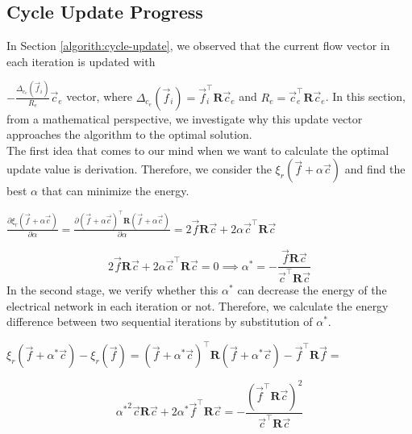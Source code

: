 \subsection{Cycle Update Progress}
\label{cycle-update-progress}
In Section \ref{algorith:cycle-update}, we observed that the current flow vector in each iteration is updated with 

$-\frac{\Delta_{c_e}(\overrightarrow{f}_i)}{R_e} \overrightarrow{c}_e$ vector, where $\Delta_{c_e}(\overrightarrow{f}_i) = \overrightarrow{f}_i^\top \mathbf{R} \overrightarrow{c}_e$ and $R_e=\overrightarrow{c}_e^\top \mathbf{R} \overrightarrow{c}_e$. In this section, from a mathematical perspective, we investigate why this update vector approaches the algorithm to the optimal solution.\\
The first idea that comes to our mind when we want to calculate the optimal update value is derivation. Therefore, we consider the $\xi_r(\overrightarrow{f}+\alpha \overrightarrow{c})$ and find the best $\alpha$ that can minimize the energy.
\begin{center}
    
    $\frac{\partial \xi_r(\overrightarrow{f}+\alpha \overrightarrow{c})}{\partial \alpha} =
    \frac{\partial (\overrightarrow{f}+\alpha \overrightarrow{c})^\top \textbf{R} (\overrightarrow{f}+\alpha \overrightarrow{c})}{\partial \alpha}= 2 \overrightarrow{f} \textbf{R} \overrightarrow{c} + 2 \alpha \overrightarrow{c}^\top \textbf{R} \overrightarrow{c}$
\end{center}
\begin{equation}
    \label{gradient-to-alpha}
    2 \overrightarrow{f} \textbf{R} \overrightarrow{c} + 2 \alpha \overrightarrow{c}^\top \textbf{R} \overrightarrow{c}=0 \implies \alpha^* = -\frac{\overrightarrow{f} \textbf{R} \overrightarrow{c}}{\overrightarrow{c}^\top \textbf{R} \overrightarrow{c}}
\end{equation}
In the second stage, we verify whether this $\alpha^*$ can decrease the energy of the electrical network in each iteration or not. Therefore, we calculate the energy difference between two sequential iterations by substitution of $\alpha^*$. 
\begin{center}
    $\xi_r(\overrightarrow{f}+\alpha^* \overrightarrow{c}) - \xi_r(\overrightarrow{f})=(\overrightarrow{f}+\alpha^* \overrightarrow{c})^\top \textbf{R} (\overrightarrow{f}+\alpha^* \overrightarrow{c}) - \overrightarrow{f}^\top \textbf{R} \overrightarrow{f}=$
\end{center}
\begin{equation}
\label{energy-decrease}
    {\alpha^*}^2 \overrightarrow{c} \textbf{R} \overrightarrow{c}+2 \alpha^* \overrightarrow{f}^\top \textbf{R} \overrightarrow{c}=-\frac{(\overrightarrow{f}^\top \mathbf{R} \overrightarrow{c})^2}{\overrightarrow{c}^\top \mathbf{R} \overrightarrow{c}}
\end{equation}
